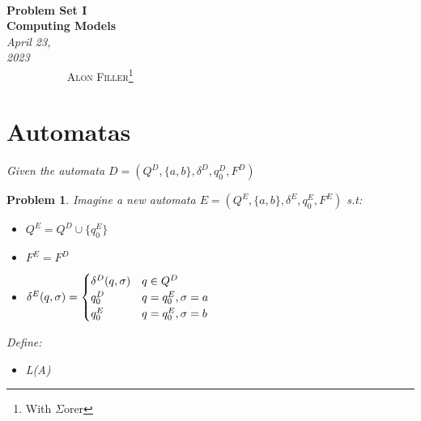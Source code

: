 \documentclass[12pt]{article}
\renewcommand{\=}[1]{\stackrel{#1}{=}} %
\newtheorem{p}{Problem}[section]
\theoremstyle{definition}
\begin{document}
{\noindent\Huge\bf  \\[0.5\baselineskip] {\selectfont  Problem Set I}         }\\[2\baselineskip] %
{ {\bf {}\selectfont Computing Models}\\ {\textit{\selectfont     April 23, 2023}}}~~~~~~~~~~~~~~~~~~~~~~~~~~~~~~~~~~~~~~~~~~~~~~~~~~~~~~~~~~~~~~~~~~~~~~~~~~~~~    {\large \textsc{Alon Filler}\footnote{With $\Sigma$orer}} %
\\[1.4\baselineskip] 



\section{Automatas}
\emph{Given the automata $D = (Q^{D}, \{a,b\}, \delta^{D}, q_0^{D}, F^{D})$} \newline
\begin{p}
\emph{\newline Imagine a new automata $E = (Q^{E}, \{a,b\}, \delta^{E}, q_0^{E}, F^{E})$} s.t: \newline
\begin{itemize}
  \item $Q^{E} = Q^{D} \cup \{q_0^{E}\}$
  \item $F^{E} = F^{D}$
  \item \(
    \hspace{0mm}
    \delta^{E}(q, \sigma) = 
    \begin{cases}
      \delta^{D}(q, \sigma) & q \in Q^{D} \\
        q_0^{D} & q = q_0^{E}, \sigma = a \\ 
        q_0^{E} & q = q_0^{E}, \sigma = b
    \end{cases}
  \)
\end{itemize}

Define: 
\begin{itemize}
  \item L(A)
\end{itemize}
\end{p}
\end{document}

